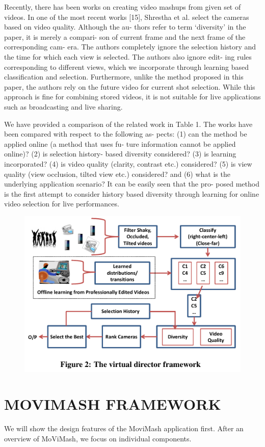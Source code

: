 \documentclass{sig-alternate}
\begin{document}
Recently, there has been works on creating video mashups from
given set of videos. In one of the most recent works [15], Shrestha
et al. select the cameras based on video quality. Although the au-
thors refer to term ‘diversity’ in the paper, it is merely a compari-
son of current frame and the next frame of the corresponding cam-
era. The authors completely ignore the selection history and the
time for which each view is selected. The authors also ignore edit-
ing rules corresponding to different views, which we incorporate
through learning based classification and selection. Furthermore,
unlike the method proposed in this paper, the authors rely on the
future video for current shot selection. While this approach is fine
for combining stored videos, it is not suitable for live applications
such as broadcasting and live sharing.

We have provided a comparison of the related work in Table 1.
The works have been compared with respect to the following as-
pects: (1) can the method be applied online (a method that uses fu-
ture information cannot be applied online)? (2) is selection history-
based diversity considered? (3) is learning incorporated? (4) is
video quality (clarity, contrast etc.) considered? (5) is view quality
(view occlusion, tilted view etc.) considered? and (6) what is the
underlying application scenario? It can be easily seen that the pro-
posed method is the first attempt to consider history based diversity
through learning for online video selection for live performances.
\begin{figure}{
\includegraphics{image3.pdf}}
\end{figure}
\section{MOVIMASH FRAMEWORK}
We will show the design features of the MoviMash application first. After an overview of MoViMash, we focus on individual components.
\end{document}
